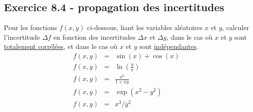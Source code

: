 \subsection*{Exercice 8.4 - propagation des incertitudes}

Pour les fonctions $f(x,y)$ ci-dessous, liant les variables aléatoires $x$ et $y$, calculer l'incertitude $\Delta f$ en fonction des incertitudes $\Delta x$ et $\Delta y$, dans le cas où $x$ et $y$ sont \underline{totalement corrélées}, et dans le cas où $x$ et $y$ sont \underline{indépendantes}.
\begin{eqnarray*}
    f(x,y)&=&\sin(x)+\cos(x) \\
    f(x,y)&=&\ln\left(\frac{y}{x}\right) \\
    f(x,y)&=&\frac{x^2}{1+xy} \\
    f(x,y)&=&\exp(x^2-y^2) \\
    f(x,y)&=&x^3/y^2 \\
\end{eqnarray*}
